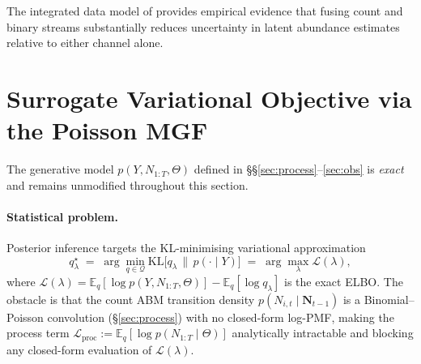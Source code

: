 \documentclass[review,12pt]{elsarticle}
\theoremstyle{definition}
\begin{document}
\noindent
The integrated data model of \citet{verhoef2025} provides empirical evidence
that fusing count and binary streams substantially reduces uncertainty in
latent abundance estimates relative to either channel alone.

\section{Surrogate Variational Objective via the Poisson MGF}
\label{sec:vi}

The generative model $p(Y,N_{1:T},\Theta)$ defined
in \S\S\ref{sec:process}--\ref{sec:obs} is \emph{exact} and remains unmodified
throughout this section.

\paragraph{Statistical problem.}
Posterior inference targets the KL-minimising variational approximation
\begin{equation}\label{eq:kl-problem}
q^\star_\lambda
\;=\;
\arg\min_{q\in\mathcal{Q}}
\mathrm{KL}\!\bigl[q_\lambda\,\|\,p(\cdot\mid Y)\bigr]
\;=\;
\arg\max_{\lambda}
\mathcal{L}(\lambda),
\end{equation}
where $\mathcal{L}(\lambda)=\mathbb{E}_q[\log p(Y,N_{1:T},\Theta)]
-\mathbb{E}_q[\log q_\lambda]$ is the exact ELBO.
The obstacle is that the count ABM transition density
$p(N_{i,t}\mid\mathbf{N}_{t-1})$ is a Binomial--Poisson convolution
(\S\ref{sec:process}) with no closed-form log-PMF, making the process term
$\mathcal{L}_\mathrm{proc}:=\mathbb{E}_q[\log p(N_{1:T}\mid\Theta)]$
analytically intractable and blocking any closed-form evaluation of
$\mathcal{L}(\lambda)$.
\end{document}
